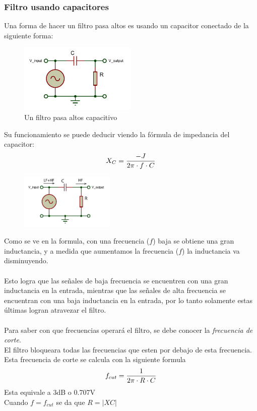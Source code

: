 \documentclass[../main.tex]{subfiles}
\begin{document}
		\subsubsection{Filtro usando capacitores}
		Una forma de hacer un filtro pasa altos es usando un capacitor conectado 
		de la siguiente forma:
		\begin{figure}[H]
			\centering
			\includegraphics[width=0.5\textwidth]{filtros/pasa-alto_cap1.pdf}
			\caption{Un filtro pasa altos capacitivo}
		\end{figure}
		Su funcionamiento se puede deducir viendo la fórmula de impedancia del capacitor:
		\[
			X_C = \dfrac{-J}{2\pi \cdot f \cdot C}
		\]
		\begin{figure}
			\centering
			\includegraphics[width=0.4\textwidth]{filtros/pasa-alto_cap2.pdf}
			\caption{}
		\end{figure}
		Como se ve en la formula, con una frecuencia ($f$) baja se obtiene una gran 
		inductancia, y a medida que aumentamos la frecuencia ($f$) la inductancia va 
		disminuyendo. \\\\
		Esto logra que las señales de baja frecuencia se encuentren con una gran inductancia
		en la entrada, mientras que las señales de alta frecuencia se encuentran con 
		una baja inductancia en la entrada, por lo tanto solamente estas últimas logran
		atravezar el filtro. \\\\
		Para saber con que frecuencias operará el filtro, se debe conocer la
		\emph{frecuencia de corte}.\\
		El filtro bloqueara todas las frecuencias que esten por debajo
		de esta frecuencia.\\
		Esta frecuencia de corte se calcula con la siguiente formula
		\[
			f_{cut} = \dfrac{1}{2\pi \cdot R \cdot C}
		\]
		Esta equivale a 3dB o 0.707V\\
		Cuando $f = f_{cut}$ se da que $R = \left| XC \right|$
\end{document}
